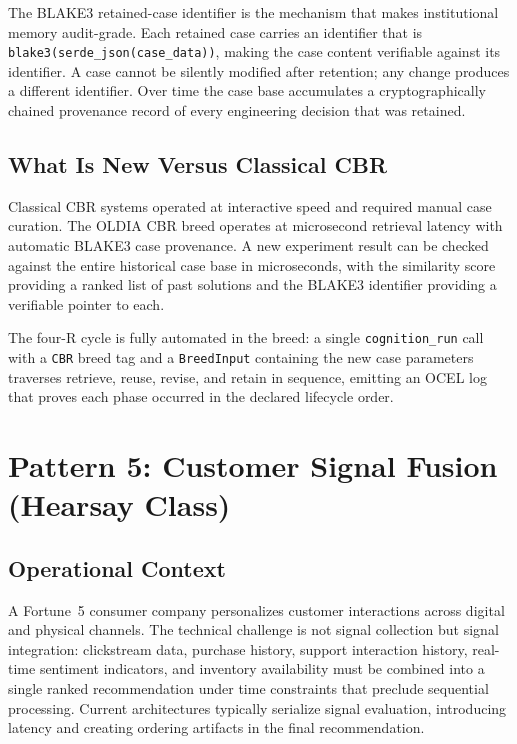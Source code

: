 The BLAKE3 retained-case identifier is the mechanism that makes institutional
memory audit-grade. Each retained case carries an identifier that is
\texttt{blake3(serde\_json(case\_data))}, making the case content verifiable
against its identifier. A case cannot be silently modified after retention; any
change produces a different identifier. Over time the case base accumulates a
cryptographically chained provenance record of every engineering decision that
was retained.

\subsection*{What Is New Versus Classical CBR}

Classical CBR systems operated at interactive speed and required manual case
curation. The OLDIA CBR breed operates at microsecond retrieval latency with
automatic BLAKE3 case provenance. A new experiment result can be checked against
the entire historical case base in microseconds, with the similarity score providing
a ranked list of past solutions and the BLAKE3 identifier providing a verifiable
pointer to each.

The four-R cycle is fully automated in the breed: a single \texttt{cognition\_run}
call with a \texttt{CBR} breed tag and a \texttt{BreedInput} containing the new
case parameters traverses retrieve, reuse, revise, and retain in sequence, emitting
an OCEL log that proves each phase occurred in the declared lifecycle order.

\section{Pattern 5: Customer Signal Fusion (Hearsay Class)}
\label{sec:hearsay-deployment}

\subsection*{Operational Context}

A Fortune~5 consumer company personalizes customer interactions across digital
and physical channels. The technical challenge is not signal collection but signal
integration: clickstream data, purchase history, support interaction history,
real-time sentiment indicators, and inventory availability must be combined into
a single ranked recommendation under time constraints that preclude sequential
processing. Current architectures typically serialize signal evaluation, introducing
latency and creating ordering artifacts in the final recommendation.

